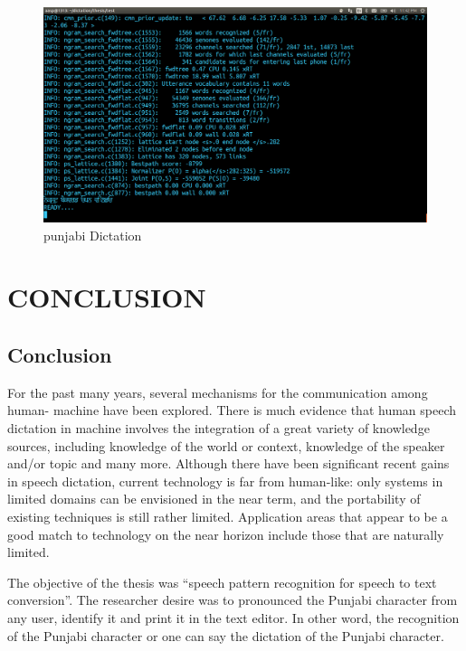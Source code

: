 \documentclass[12pt,a4paper,oldfontcommands]{memoir}
\begin{document}
\begin{figure}[h]
    \centering
    \includegraphics[scale=0.3]{Screenshot6}
    \caption{punjabi Dictation}
\end{figure}


\chapter{CONCLUSION}

\section{Conclusion}
For the past many years, several mechanisms for the communication among human-
machine have been explored. There is much evidence that human speech dictation in
machine involves the integration of a great variety of knowledge sources, including
knowledge of the world or context, knowledge of the speaker and/or topic and many
more. Although there have been significant recent gains in speech dictation, current
technology is far from human-like: only systems in limited domains can be envisioned
in the near term, and the portability of existing techniques is still rather limited.
Application areas that appear to be a good match to technology on the near horizon
include those that are naturally limited.

The objective of the thesis was “speech pattern recognition for speech to text
conversion”. The researcher desire was to pronounced the Punjabi character from any
user, identify it and print it in the text editor. In other word, the recognition of the
Punjabi character or one can say the dictation of the Punjabi character.
\end{document}
